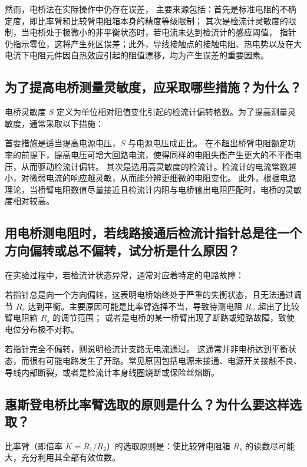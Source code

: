 \documentclass{../template/Report}%
\begin{document}
\begin{fullreportonly}
    然而，电桥法在实际操作中仍存在误差，
    主要来源包括：首先是标准电阻的不确定度，即比率臂和比较臂电阻箱本身的精度等级限制；
    其次是检流计灵敏度的限制，当电桥处于极微小的非平衡状态时，若电流未达到检流计的感应阈值，
    指针仍指示零位，这将产生死区误差；此外，导线接触点的接触电阻、热电势以及在大电流下电阻元件因自热效应引起的阻值漂移，均为产生误差的重要因素。

    \subsection{为了提高电桥测量灵敏度，应采取哪些措施？为什么？}

    电桥灵敏度 $S$ 定义为单位相对阻值变化引起的检流计偏转格数。为了提高测量灵敏度，通常采取以下措施：

    首要措施是适当提高电源电压，$S$ 与电源电压成正比。
    在不超出桥臂电阻额定功率的前提下，提高电压可增大回路电流，使得同样的电阻失衡产生更大的不平衡电压，从而驱动检流计偏转。
    其次是选用高灵敏度的检流计。检流计的电流常数越小，对微弱电流的响应越灵敏，从而能分辨更细微的电阻变化。
    此外，根据电路理论，当桥臂电阻数值尽量接近且检流计内阻与电桥输出电阻匹配时，电桥的灵敏度相对较高。

    \subsection{用电桥测电阻时，若线路接通后检流计指针总是往一个方向偏转或总不偏转，试分析是什么原因？}

    在实验过程中，若检流计状态异常，通常对应着特定的电路故障：

    若指针总是向一个方向偏转，这表明电桥始终处于严重的失衡状态，且无法通过调节 $R_s$ 达到平衡。主要原因可能是比率臂选择不当，导致待测电阻 $R_x$ 超出了比较臂电阻箱 $R_s$ 的调节范围；
    或者是电桥的某一桥臂出现了断路或短路故障，致使电位分布极不对称。

    若指针完全不偏转，则说明检流计支路无电流通过。
    这通常并非电桥达到平衡状态，而很有可能电路发生了开路。常见原因包括电源未接通、电源开关接触不良、导线内部断裂，或者是检流计本身线圈烧断或保险丝熔断。

    \subsection{惠斯登电桥比率臂选取的原则是什么？为什么要这样选取？}

    比率臂（即倍率 $K = R_1 / R_2$）的选取原则是：使比较臂电阻箱 $R_s$ 的读数尽可能大，充分利用其全部有效位数。


\end{fullreportonly}
\end{document}
